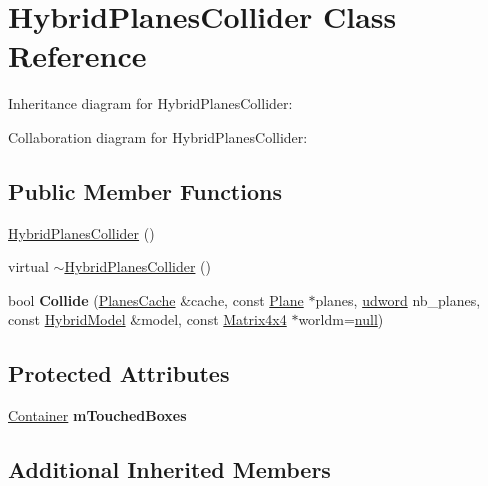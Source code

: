 \hypertarget{class_hybrid_planes_collider}{\section{Hybrid\+Planes\+Collider Class Reference}
\label{class_hybrid_planes_collider}
}


Inheritance diagram for Hybrid\+Planes\+Collider\+:


Collaboration diagram for Hybrid\+Planes\+Collider\+:
\subsection*{Public Member Functions}
\begin{DoxyCompactItemize}
\item 
\hyperlink{class_hybrid_planes_collider_a8b2d131bec9a5f4a7b6e0df2d40cdbed}{Hybrid\+Planes\+Collider} ()
\item 
virtual \hyperlink{class_hybrid_planes_collider_afb95e4c5d32a2c6f2e8a862a26d27fe1}{$\sim$\+Hybrid\+Planes\+Collider} ()
\item 
\hypertarget{class_hybrid_planes_collider_aeb4673000a3059f452ee8b48d81f5328}{bool {\bfseries Collide} (\hyperlink{struct_planes_cache}{Planes\+Cache} \&cache, const \hyperlink{class_plane}{Plane} $\ast$planes, \hyperlink{_ice_types_8h_a44c6f1920ba5551225fb534f9d1a1733}{udword} nb\+\_\+planes, const \hyperlink{class_hybrid_model}{Hybrid\+Model} \&model, const \hyperlink{class_matrix4x4}{Matrix4x4} $\ast$worldm=\hyperlink{_ice_types_8h_ac97b8ee753e4405397a42ad5799b0f9e}{null})}\label{class_hybrid_planes_collider_aeb4673000a3059f452ee8b48d81f5328}

\end{DoxyCompactItemize}
\subsection*{Protected Attributes}
\begin{DoxyCompactItemize}
\item 
\hypertarget{class_hybrid_planes_collider_a809382e70d112fcaabd71f0b8cc5754f}{\hyperlink{class_container}{Container} {\bfseries m\+Touched\+Boxes}}\label{class_hybrid_planes_collider_a809382e70d112fcaabd71f0b8cc5754f}

\end{DoxyCompactItemize}
\subsection*{Additional Inherited Members}


